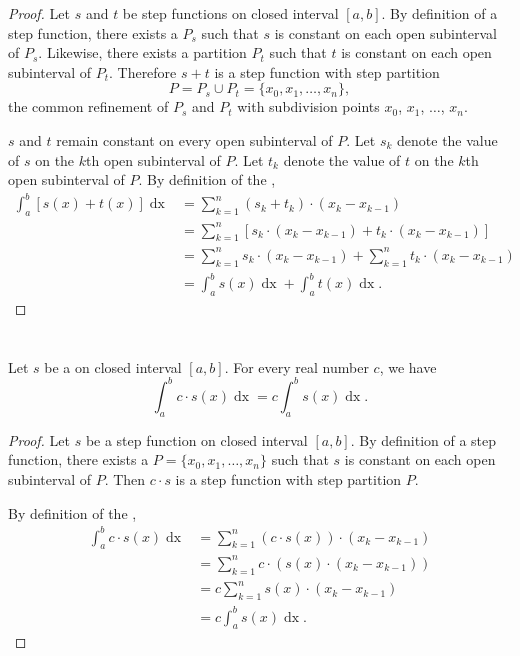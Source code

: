 \documentclass{report}
\begin{document}
\begin{proof}

  Let $s$ and $t$ be step functions on closed interval $[a, b]$.
  By definition of a step function, there exists a 
    $P_s$ such that $s$ is constant on each open subinterval of $P_s$.
  Likewise, there exists a partition $P_t$ such that $t$ is constant on each
    open subinterval of $P_t$.
  Therefore $s + t$ is a step function with step partition
    $$P = P_s \cup P_t = \{x_0, x_1, \ldots, x_n\},$$ the common refinement of
    $P_s$ and $P_t$ with subdivision points $x_0$, $x_1$, $\ldots$, $x_n$.

  $s$ and $t$ remain constant on every open subinterval of $P$.
  Let $s_k$ denote the value of $s$ on the $k$th open subinterval of $P$.
  Let $t_k$ denote the value of $t$ on the $k$th open subinterval of $P$.
  By definition of the ,
    \begin{align*}
      \int_a^b \left[ s(x) + t(x) \right] \mathop{dx}
        & = \sum_{k=1}^n (s_k + t_k) \cdot (x_k - x_{k-1}) \\
        & = \sum_{k=1}^n \left[ s_k \cdot (x_k - x_{k-1}) +
                                t_k \cdot (x_k - x_{k-1}) \right] \\
        & = \sum_{k=1}^n s_k \cdot (x_k - x_{k-1}) +
            \sum_{k=1}^n t_k \cdot (x_k - x_{k-1}) \\
        & = \int_a^b s(x) \mathop{dx} + \int_a^b t(x) \mathop{dx}.
    \end{align*}

\end{proof}

\section{}%
\label{sec:step-homogeneous-property}

Let $s$ be a  on closed interval $[a, b]$.
For every real number $c$, we have
  $$\int_a^b c \cdot s(x) \mathop{dx} = c\int_a^b s(x) \mathop{dx}.$$

\begin{proof}

  Let $s$ be a step function on closed interval $[a, b]$.
  By definition of a step function, there exists a 
    $P = \{x_0, x_1, \ldots, x_n\}$ such that $s$ is constant on each open
    subinterval of $P$.
  Then $c \cdot s$ is a step function with step partition $P$.

  By definition of the ,
    \begin{align*}
      \int_a^b c \cdot s(x) \mathop{dx}
        & = \sum_{k=1}^n (c \cdot s(x)) \cdot (x_k - x_{k-1}) \\
        & = \sum_{k=1}^n c \cdot (s(x) \cdot (x_k - x_{k-1})) \\
        & = c \sum_{k=1}^n s(x) \cdot (x_k - x_{k-1}) \\
        & = c \int_a^b s(x) \mathop{dx}.
    \end{align*}

\end{proof}
\end{document}
